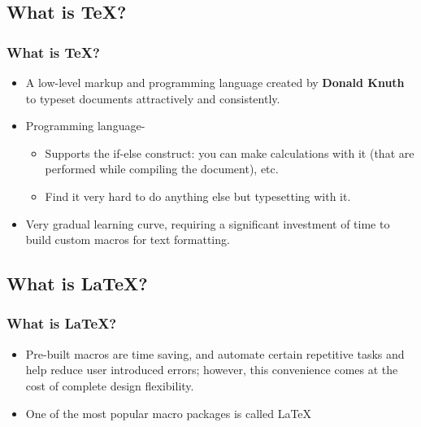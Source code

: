 \documentclass[12pt]{beamer}
\begin{document}
\begin{frame}
\section{ What is \TeX?}
\frametitle{ What is \TeX?}
\begin{itemize}\justifying
	\item A low-level markup and programming language created by \textbf{Donald Knuth} to
	typeset documents attractively and consistently.
	\item Programming language- 
	\begin{itemize}\justifying
		\item Supports the if-else construct: you can make calculations with it (that
		are performed while compiling the document), etc.
		\item Find it very hard to do
		anything else but typesetting with it.
	\end{itemize}
\item Very gradual learning curve, requiring
a significant investment of time to build custom macros for text formatting.
\end{itemize}
\end{frame}
\begin{frame}
\section{ What is \LaTeX?}
\frametitle{ What is \LaTeX?}
\begin{itemize}\justifying
	\item Pre-built macros are time saving, and automate certain repetitive tasks and
	help reduce user introduced errors; however, this convenience comes at the cost of complete
	design flexibility. 
	\item One of the most popular macro packages is called \LaTeX	
\end{itemize}
\end{frame}
\end{document}
